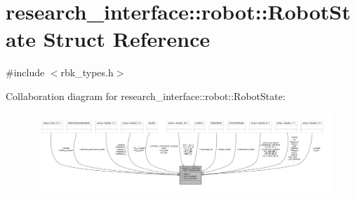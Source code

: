 \hypertarget{structresearch__interface_1_1robot_1_1RobotState}{}\section{research\+\_\+interface\+:\+:robot\+:\+:Robot\+State Struct Reference}
\label{structresearch__interface_1_1robot_1_1RobotState}


{\ttfamily \#include $<$rbk\+\_\+types.\+h$>$}



Collaboration diagram for research\+\_\+interface\+:\+:robot\+:\+:Robot\+State\+:
\nopagebreak
\begin{figure}[H]
\begin{center}
\leavevmode
\includegraphics[width=350pt]{structresearch__interface_1_1robot_1_1RobotState__coll__graph}
\end{center}
\end{figure}
